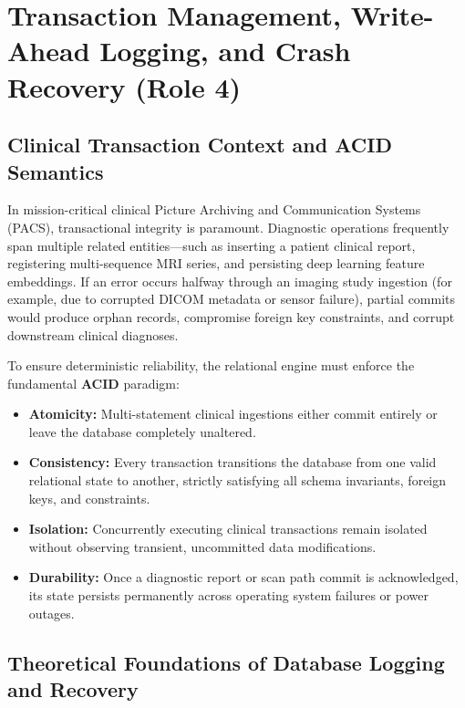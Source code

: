\chapter{Transaction Management, Write-Ahead Logging, and Crash Recovery (Role 4)}

\section{Clinical Transaction Context and ACID Semantics}
In mission-critical clinical Picture Archiving and Communication Systems (PACS), transactional integrity is paramount. Diagnostic operations frequently span multiple related entities---such as inserting a patient clinical report, registering multi-sequence MRI series, and persisting deep learning feature embeddings. If an error occurs halfway through an imaging study ingestion (for example, due to corrupted DICOM metadata or sensor failure), partial commits would produce orphan records, compromise foreign key constraints, and corrupt downstream clinical diagnoses.

To ensure deterministic reliability, the relational engine must enforce the fundamental \textbf{ACID} paradigm:
\begin{itemize}
    \item \textbf{Atomicity:} Multi-statement clinical ingestions either commit entirely or leave the database completely unaltered.
    \item \textbf{Consistency:} Every transaction transitions the database from one valid relational state to another, strictly satisfying all schema invariants, foreign keys, and  constraints.
    \item \textbf{Isolation:} Concurrently executing clinical transactions remain isolated without observing transient, uncommitted data modifications.
    \item \textbf{Durability:} Once a diagnostic report or scan path commit is acknowledged, its state persists permanently across operating system failures or power outages.
\end{itemize}

\section{Theoretical Foundations of Database Logging and Recovery}

